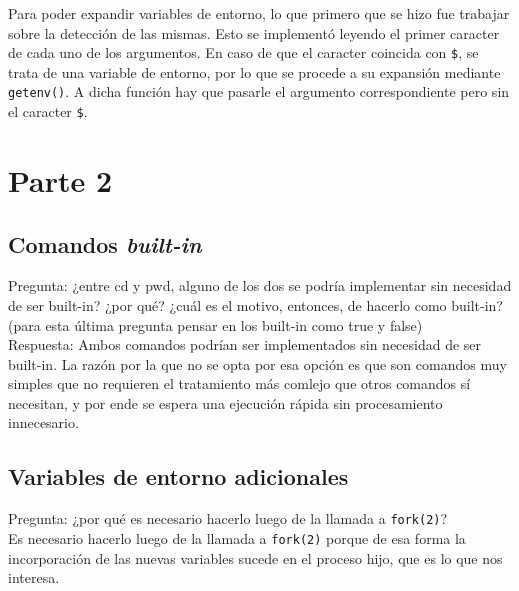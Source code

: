 \documentclass{article}
\begin{document}
Para poder expandir variables de entorno, lo que primero que se hizo fue trabajar sobre la detección de las mismas. Esto se implementó leyendo el primer caracter de cada uno de los argumentos. En caso de que el caracter coincida con \texttt{\$}, se trata de una variable de entorno, por lo que se procede a su expansión mediante \texttt{getenv()}. A dicha función hay que pasarle el argumento correspondiente pero sin el caracter \texttt{\$}.




\newpage
\section{Parte 2}
\subsection{Comandos \textit{built-in}}
Pregunta: ¿entre cd y pwd, alguno de los dos se podría implementar sin necesidad de ser built-in? ¿por qué? ¿cuál es el motivo, entonces, de hacerlo como built-in? (para esta última pregunta pensar en los built-in como true y false)\\

Respuesta: Ambos comandos podrían ser implementados sin necesidad de ser built-in. La razón por la que no se opta por esa opción es que son comandos muy simples que no requieren el tratamiento más comlejo que otros comandos sí necesitan, y por ende se espera una ejecución rápida sin procesamiento innecesario. 


\subsection{Variables de entorno adicionales}
Pregunta: ¿por qué es necesario hacerlo luego de la llamada a \texttt{fork(2)}?\\

Es necesario hacerlo luego de la llamada a \texttt{fork(2)} porque de esa forma la incorporación de las nuevas variables sucede en el proceso hijo, que es lo que nos interesa.\\
\end{document}
